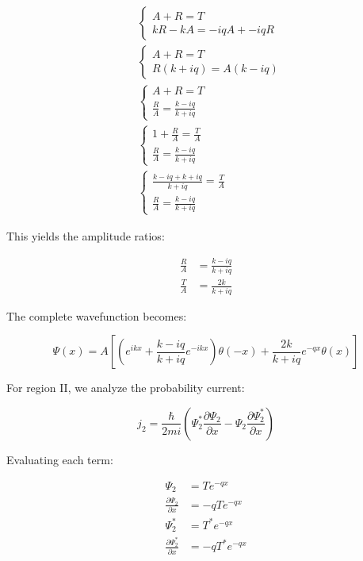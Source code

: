 \documentclass[10pt]{article}
\begin{document}
\begin{align*}
& \left\{\begin{array}{l}
A+R=T \\
k R-k A=-i q A+-i q R
\end{array}\right. \\
& \left\{\begin{array}{l}
A+R=T \\
R(k+i q)=A(k-i q)
\end{array}\right. \\
& \left\{\begin{array}{l}
A+R=T \\
\frac{R}{A}=\frac{k-i q}{k+i q}
\end{array}\right.  \tag{6.40}\\
& \left\{\begin{array}{l}
1+\frac{R}{A}=\frac{T}{A} \\
\frac{R}{A}=\frac{k-i q}{k+i q}
\end{array}\right. \\
& \left\{\begin{array}{l}
\frac{k-i q+k+i q}{k+i q}=\frac{T}{A} \\
\frac{R}{A}=\frac{k-i q}{k+i q}
\end{array}\right.
\end{align*}

This yields the amplitude ratios:

\begin{align*}
\frac{R}{A} & =\frac{k-i q}{k+i q} \\
\frac{T}{A} & =\frac{2 k}{k+i q} \tag{6.41}
\end{align*}

The complete wavefunction becomes:

\begin{equation*}
\Psi(x)=A\left[\left(e^{i k x}+\frac{k-i q}{k+i q} e^{-i k x}\right) \theta(-x)+\frac{2 k}{k+i q} e^{-q x} \theta(x)\right] \tag{6.42}
\end{equation*}

For region II, we analyze the probability current:

\begin{equation*}
j_{2}=\frac{\hbar}{2 m i}\left(\Psi_{2}^{*} \frac{\partial \Psi_{2}}{\partial x}-\Psi_{2} \frac{\partial \Psi_{2}^{*}}{\partial x}\right) \tag{6.43}
\end{equation*}

Evaluating each term:

\begin{align*}
\Psi_{2} & =T e^{-q x} \\
\frac{\partial \Psi_{2}}{\partial x} & =-q T e^{-q x} \\
\Psi_{2}^{*} & =T^{*} e^{-q x}  \tag{6.44}\\
\frac{\partial \Psi_{2}^{*}}{\partial x} & =-q T^{*} e^{-q x}
\end{align*}
\end{document}
